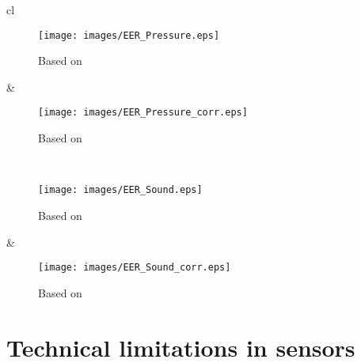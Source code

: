 \documentclass{article}
\begin{document}
\addtocounter{figure}{-1}
\begin{figure*}[h]
    \centering
\begin{xtabular*}{\textwidth}{cl}
 \\
    \begin{subfigure}[b]{0.45\textwidth}
        \texttt{[image: images/EER\_Pressure.eps]}
        \caption{Based on }
        \label{fig:EER_Pressure}
        \end{subfigure}
 &
     \begin{subfigure}[b]{0.45\textwidth}
        \texttt{[image: images/EER\_Pressure\_corr.eps]}
        \caption{Based on }
        \label{fig:EER-Corr_Pressure_corr}
    \end{subfigure}
 \\
    \begin{subfigure}[b]{0.45\textwidth}
        \texttt{[image: images/EER\_Sound.eps]}
        \caption{Based on }
        \label{fig:EER_Sound}
    \end{subfigure}
    &
    \begin{subfigure}[b]{0.45\textwidth}
        \texttt{[image: images/EER\_Sound\_corr.eps]}
        \caption{Based on }
        \label{fig:EER_Sound_corr}
    \end{subfigure}
    \end{xtabular*}
\end{figure*}

\section{Technical limitations in sensors}
\label{sec:appendixB}
\end{document}
